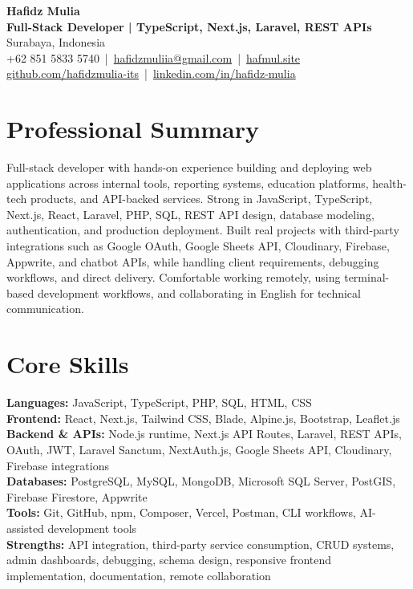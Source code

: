 \documentclass[a4paper,11pt]{article}
\begin{document}
{\LARGE \textbf{Hafidz Mulia}}\\
\textbf{Full-Stack Developer | TypeScript, Next.js, Laravel, REST APIs}\\
Surabaya, Indonesia \\
+62 851 5833 5740 \,|\, \href{mailto:hafidzmuliia@gmail.com}{hafidzmuliia@gmail.com} \,|\, \href{https://hafmul.site}{hafmul.site} \\
\href{https://github.com/hafidzmulia-its}{github.com/hafidzmulia-its} \,|\, \href{https://www.linkedin.com/in/hafidz-mulia/}{linkedin.com/in/hafidz-mulia}

\section*{Professional Summary}
Full-stack developer with hands-on experience building and deploying web applications across internal tools, reporting systems, education platforms, health-tech products, and API-backed services. Strong in JavaScript, TypeScript, Next.js, React, Laravel, PHP, SQL, REST API design, database modeling, authentication, and production deployment. Built real projects with third-party integrations such as Google OAuth, Google Sheets API, Cloudinary, Firebase, Appwrite, and chatbot APIs, while handling client requirements, debugging workflows, and direct delivery. Comfortable working remotely, using terminal-based development workflows, and collaborating in English for technical communication.

\section*{Core Skills}
\textbf{Languages:} JavaScript, TypeScript, PHP, SQL, HTML, CSS \\
\textbf{Frontend:} React, Next.js, Tailwind CSS, Blade, Alpine.js, Bootstrap, Leaflet.js \\
\textbf{Backend \& APIs:} Node.js runtime, Next.js API Routes, Laravel, REST APIs, OAuth, JWT, Laravel Sanctum, NextAuth.js, Google Sheets API, Cloudinary, Firebase integrations \\
\textbf{Databases:} PostgreSQL, MySQL, MongoDB, Microsoft SQL Server, PostGIS, Firebase Firestore, Appwrite \\
\textbf{Tools:} Git, GitHub, npm, Composer, Vercel, Postman, CLI workflows, AI-assisted development tools \\
\textbf{Strengths:} API integration, third-party service consumption, CRUD systems, admin dashboards, debugging, schema design, responsive frontend implementation, documentation, remote collaboration
\end{document}
